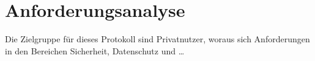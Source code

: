 \chapter{Anforderungsanalyse}



Die Zielgruppe für dieses Protokoll sind Privatnutzer, woraus sich Anforderungen in den Bereichen Sicherheit,
Datenschutz und \dots




